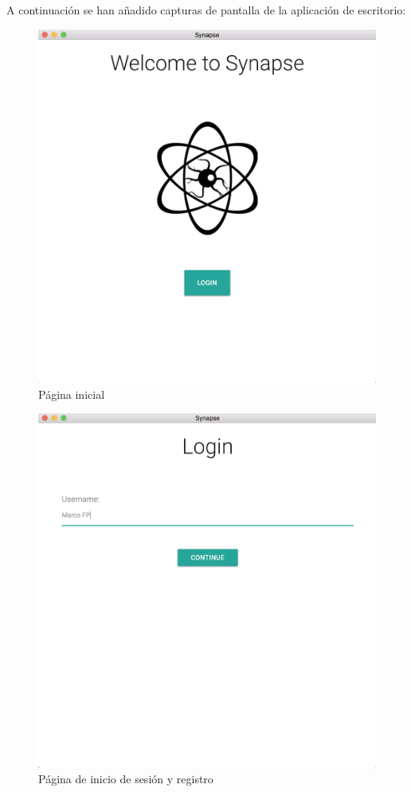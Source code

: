 A continuación se han añadido capturas de pantalla de la aplicación de escritorio:

\begin{figure}[H]
	\centering
	\includegraphics[width=\textwidth, cfbox=black .5pt .5pt]{imagenes/desktop-landing-page}
	\caption{Página inicial}
	\label{fig:desktop-landing-page}
\end{figure}

\begin{figure}[H]
	\centering
	\includegraphics[width=\textwidth, cfbox=black .5pt .5pt]{imagenes/desktop-login-page}
	\caption{Página de inicio de sesión y registro}
	\label{fig:desktop-login}
\end{figure}

